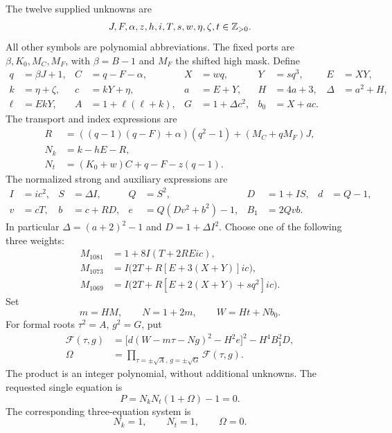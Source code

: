 The twelve supplied unknowns are
\[
 J,F,\alpha,z,h,i,T,s,w,\eta,\zeta,t\in\mathbb Z_{>0}.
\]
All other symbols are polynomial abbreviations. The fixed ports are $\beta,K_0,M_C,M_F$, with $\beta=B-1$ and $M_F$ the shifted high
mask. Define
\begin{align*}
 q&=\beta J+1,& C&=q-F-\alpha,& X&=wq,& Y&=sq^3,& E&=XY,\\
 k&=\eta+\zeta,&c&=kY+\eta,&a&=E+Y,&H&=4a+3,&\Delta&=a^2+H,\\
 \ell&=EkY,& A&=1+\ell(\ell+k),&G&=1+\Delta c^2,&b_0&=X+ac.
\end{align*}
The transport and index expressions are
\begin{align*}
 R&=((q-1)(q-F)+\alpha)(q^2-1)+(M_C+qM_F)J,\\
 N_k&=k-hE-R,\\
 N_t&=(K_0+w)C+q-F-z(q-1).
\end{align*}
The normalized strong and auxiliary expressions are
\begin{align*}
 I&=ic^2,& S&=\Delta I,&Q&=S^2,&D&=1+IS,&d&=Q-1,\\
 v&=cT,& b&=c+RD,&e&=Q(Dv^2+b^2)-1,&B_1&=2Qvb.
\end{align*}
In particular $\Delta=(a+2)^2-1$ and $D=1+\Delta I^2$.
Choose one of the following three weights:
\begin{align}
 M_{1081}&=1+8I(T+2REic),\label{eq:m1081}\\
 M_{1073}&=I\bigl(2T+R[E+3(X+Y)]ic\bigr),\label{eq:m1073}\\
 M_{1069}&=I\bigl(2T+R[E+2(X+Y)+sq^2]ic\bigr).
 \label{eq:m1069}
\end{align}
Set
\[
 m=HM,\qquad N=1+2m,\qquad W=Ht+Nb_0.
\]
For formal roots $\tau^2=A$, $g^2=G$, put
\begin{align}
 \mathcal F(\tau,g)
 &=\bigl[d(W-m\tau-Ng)^2-H^2e\bigr]^2-H^4B_1^2D,
 \label{eq:formalF}\\
 \Omega&=\prod_{\tau=\pm\sqrt A,\,g=\pm\sqrt G}
                   \mathcal F(\tau,g).\label{eq:omega}
\end{align}
The product is an integer polynomial, without additional unknowns.
The requested single equation is
\begin{equation}
 \boxed{\quad P=N_kN_t(1+\Omega)-1=0.\quad}
 \label{eq:positiveP}
\end{equation}
The corresponding three-equation system is
\begin{equation}
 N_k=1,\qquad N_t=1,\qquad \Omega=0.
 \label{eq:positiveSystem}
\end{equation}

